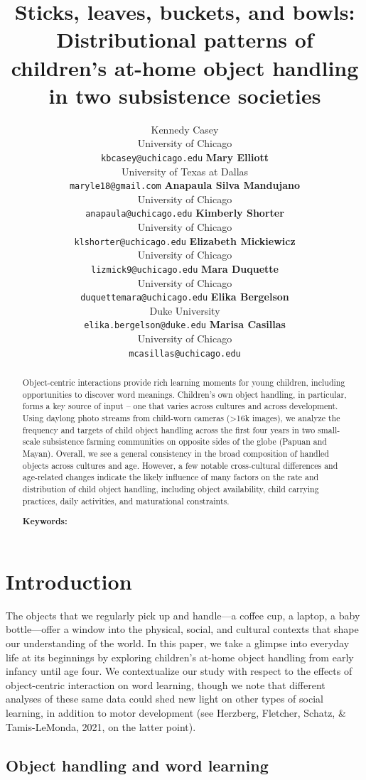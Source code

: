 \documentclass[10pt, letterpaper]{article}
\title{Sticks, leaves, buckets, and bowls: Distributional patterns of
children's at-home object handling in two subsistence societies}
\author{Kennedy Casey \\
        University of Chicago \\
        \texttt{\small{kbcasey@uchicago.edu}}
\And \textbf{Mary Elliott} \\
             University of Texas at Dallas \\
             \texttt{\small{maryle18@gmail.com}}
\And \textbf{Anapaula Silva Mandujano} \\
             University of Chicago \\
             \texttt{\small{anapaula@uchicago.edu}}   
\And \textbf{Kimberly Shorter} \\
             University of Chicago \\
             \texttt{\small{klshorter@uchicago.edu}}
\AND \textbf{Elizabeth Mickiewicz} \\
             University of Chicago \\
             \texttt{\small{lizmick9@uchicago.edu}}         
\And \textbf{Mara Duquette} \\
             University of Chicago \\
             \texttt{\small{duquettemara@uchicago.edu}}
\And \textbf{Elika Bergelson} \\
             Duke University \\
             \texttt{\small{elika.bergelson@duke.edu}}
\And \textbf{Marisa Casillas} \\
             University of Chicago \\
             \texttt{\small{mcasillas@uchicago.edu}}}
\begin{document}
\maketitle

\begin{abstract}
Object-centric interactions provide rich learning moments for young
children, including opportunities to discover word meanings. Children's
own object handling, in particular, forms a key source of input -- one
that varies across cultures and across development. Using daylong photo
streams from child-worn cameras (\textgreater16k images), we analyze the
frequency and targets of child object handling across the first four
years in two small-scale subsistence farming communities on opposite
sides of the globe (Papuan and Mayan). Overall, we see a general
consistency in the broad composition of handled objects across cultures
and age. However, a few notable cross-cultural differences and
age-related changes indicate the likely influence of many factors on the
rate and distribution of child object handling, including object
availability, child carrying practices, daily activities, and
maturational constraints.

\textbf{Keywords:}

\end{abstract}

\hypertarget{introduction}{%
\section{Introduction}\label{introduction}}

The objects that we regularly pick up and handle---a coffee cup, a
laptop, a baby bottle---offer a window into the physical, social, and
cultural contexts that shape our understanding of the world. In this
paper, we take a glimpse into everyday life at its beginnings by
exploring children's at-home object handling from early infancy until
age four. We contextualize our study with respect to the effects of
object-centric interaction on word learning, though we note that
different analyses of these same data could shed new light on other
types of social learning, in addition to motor development (see
Herzberg, Fletcher, Schatz, \& Tamis-LeMonda, 2021, on the latter
point).

\hypertarget{object-handling-and-word-learning}{%
\subsection{Object handling and word
learning}\label{object-handling-and-word-learning}}
\end{document}
